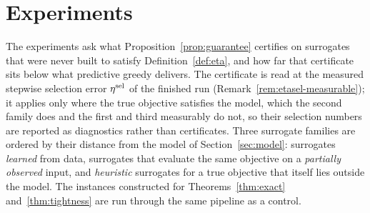 %
%
%
%

\section{Experiments}\label{sec:experiments}

The experiments ask what Proposition~\ref{prop:guarantee} certifies on
surrogates that were never built to satisfy Definition~\ref{def:eta}, and how
far that certificate sits below what predictive greedy delivers.  The
certificate is read at the measured stepwise selection error $\eta^{\mathrm{sel}}$ of the
finished run (Remark~\ref{rem:etasel-measurable}); it applies only where the
true objective satisfies the model, which the second family does and the
first and third measurably do not, so their selection numbers are reported
as diagnostics rather than certificates.  Three surrogate families are
ordered by their distance from the model of Section~\ref{sec:model}:
surrogates \emph{learned} from data, surrogates that evaluate the same
objective on a \emph{partially observed} input, and \emph{heuristic}
surrogates for a true objective that itself lies outside the model.  The
instances constructed for Theorems~\ref{thm:exact} and~\ref{thm:tightness}
are run through the same pipeline as a control.

